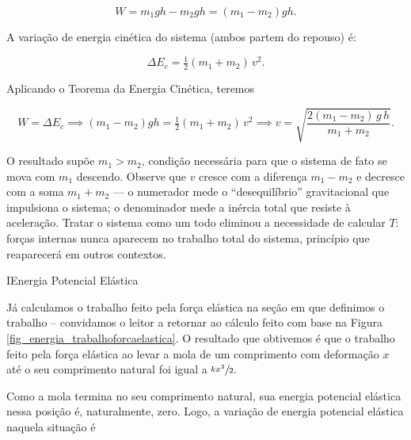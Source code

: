 \begin{exemplo}
$$ W = m_1gh - m_2gh = (m_1 - m_2)gh.$$


A variação de energia cinética do sistema (ambos partem do repouso) é:

\[
  \Delta E_c = \tfrac{1}{2}(m_1 + m_2)\,v^2.
\]

Aplicando o Teorema da Energia Cinética, teremos

\[
  W = \Delta E_c \implies(m_1 - m_2)gh = \tfrac{1}{2}(m_1 + m_2)\,v^2 \implies \boxed{v = \sqrt{\frac{2(m_1 - m_2)\,g\,h}{m_1 + m_2}}.}
\]



\noindent O resultado supõe $m_1 > m_2$, condição necessária para que
o sistema de fato se mova com $m_1$ descendo. Observe que $v$ cresce
com a diferença $m_1 - m_2$ e decresce com a soma $m_1 + m_2$ ---
o numerador mede o ``desequilíbrio'' gravitacional que impulsiona o
sistema; o denominador mede a inércia total que resiste à aceleração.
Tratar o sistema como um todo eliminou a necessidade de calcular $T$:
forças internas nunca aparecem no trabalho total do sistema,
princípio que reaparecerá em outros contextos.


\end{exemplo}


\vspace{0.3cm}





\begin{secnivel}{I}{Energia Potencial Elástica}
 

  
\end{secnivel}






Já calculamos o trabalho feito pela força elástica na seção em que definimos o trabalho -- convidamos o leitor a retornar ao cálculo feito com base na Figura \ref{fig_energia_trabalhoforcaelastica}. O resultado que obtivemos é que o trabalho feito pela força elástica ao levar a mola de um comprimento com deformação $x$ até o seu comprimento natural foi igual a $\sfrac{kx^2}{2}.$


Como a mola termina no seu comprimento natural, sua energia potencial elástica nessa posição é, naturalmente, zero. Logo, a variação de energia potencial elástica naquela situação é 

